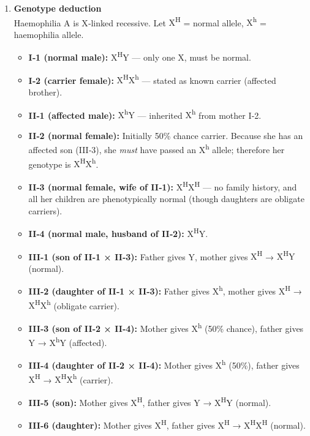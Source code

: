 \documentclass[11pt]{article}
\newcommand{\cle}[1]{{\popxbold\color{popdark}#1}}
\begin{document}
\begin{enumerate}
    \item \textbf{Genotype deduction}\\
    Haemophilia A is X‑linked recessive. Let \cle{X\textsuperscript{H}} = normal allele, \cle{X\textsuperscript{h}} = haemophilia allele.
    \begin{itemize}
        \item \textbf{I‑1 (normal male):} \cle{X\textsuperscript{H}Y} — only one X, must be normal.
        \item \textbf{I‑2 (carrier female):} \cle{X\textsuperscript{H}X\textsuperscript{h}} — stated as known carrier (affected brother).
        \item \textbf{II‑1 (affected male):} \cle{X\textsuperscript{h}Y} — inherited \cle{X\textsuperscript{h}} from mother I‑2.
        \item \textbf{II‑2 (normal female):} Initially 50\% chance carrier. Because she has an affected son (III‑3), she \emph{must} have passed an \cle{X\textsuperscript{h}} allele; therefore her genotype is \cle{X\textsuperscript{H}X\textsuperscript{h}}.
        \item \textbf{II‑3 (normal female, wife of II‑1):} \cle{X\textsuperscript{H}X\textsuperscript{H}} — no family history, and all her children are phenotypically normal (though daughters are obligate carriers).
        \item \textbf{II‑4 (normal male, husband of II‑2):} \cle{X\textsuperscript{H}Y}.
        \item \textbf{III‑1 (son of II‑1 × II‑3):} Father gives Y, mother gives \cle{X\textsuperscript{H}} → \cle{X\textsuperscript{H}Y} (normal).
        \item \textbf{III‑2 (daughter of II‑1 × II‑3):} Father gives \cle{X\textsuperscript{h}}, mother gives \cle{X\textsuperscript{H}} → \cle{X\textsuperscript{H}X\textsuperscript{h}} (obligate carrier).
        \item \textbf{III‑3 (son of II‑2 × II‑4):} Mother gives \cle{X\textsuperscript{h}} (50\% chance), father gives Y → \cle{X\textsuperscript{h}Y} (affected).
        \item \textbf{III‑4 (daughter of II‑2 × II‑4):} Mother gives \cle{X\textsuperscript{h}} (50\%), father gives \cle{X\textsuperscript{H}} → \cle{X\textsuperscript{H}X\textsuperscript{h}} (carrier).
        \item \textbf{III‑5 (son):} Mother gives \cle{X\textsuperscript{H}}, father gives Y → \cle{X\textsuperscript{H}Y} (normal).
        \item \textbf{III‑6 (daughter):} Mother gives \cle{X\textsuperscript{H}}, father gives \cle{X\textsuperscript{H}} → \cle{X\textsuperscript{H}X\textsuperscript{H}} (normal).

\end{itemize}
\end{enumerate}
\end{document}
